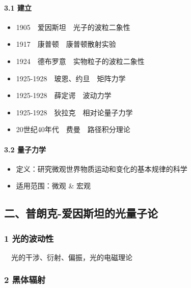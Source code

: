 \documentclass[UTF8,twocolumn]{ctexart}
\providecommand{\tightlist}{%
  \setlength{\itemsep}{0pt}\setlength{\parskip}{0pt}}
\let\oldparagraph\paragraph
\renewcommand{\paragraph}[1]{\oldparagraph{#1}\mbox{}}
\begin{document}
\hypertarget{ux5efaux7acb-1}{%
\paragraph{{ }3.1 建立}\label{ux5efaux7acb-1}}

\begin{itemize}
\tightlist
\item
  1905 爱因斯坦 光子的波粒二象性
\item
  1917 康普顿 康普顿散射实验
\item
  1924 德布罗意 实物粒子的波粒二象性
\item
  1925-1928 玻恩、约旦 矩阵力学
\item
  1925-1928 薛定谔 波动力学
\item
  1925-1928 狄拉克 相对论量子力学
\item
  20世纪40年代 费曼 路径积分理论
\end{itemize}

\hypertarget{ux91cfux5b50ux529bux5b66}{%
\paragraph{{ }3.2 量子力学}\label{ux91cfux5b50ux529bux5b66}}

\begin{itemize}
\tightlist
\item
  定义：研究微观世界物质运动和变化的基本规律的科学
\item
  适用范围：微观 \& 宏观
\end{itemize}

\hypertarget{ux4e8cux666eux6717ux514b-ux7231ux56e0ux65afux5766ux7684ux5149ux91cfux5b50ux8bba}{%
\subsection{二、普朗克-爱因斯坦的光量子论}\label{ux4e8cux666eux6717ux514b-ux7231ux56e0ux65afux5766ux7684ux5149ux91cfux5b50ux8bba}}

\hypertarget{ux5149ux7684ux6ce2ux52a8ux6027}{%
\subsubsection{1 光的波动性}\label{ux5149ux7684ux6ce2ux52a8ux6027}}

 光的干涉、衍射、偏振，光的电磁理论

\hypertarget{ux9ed1ux4f53ux8f90ux5c04}{%
\subsubsection{2 黑体辐射}\label{ux9ed1ux4f53ux8f90ux5c04}}
\end{document}
